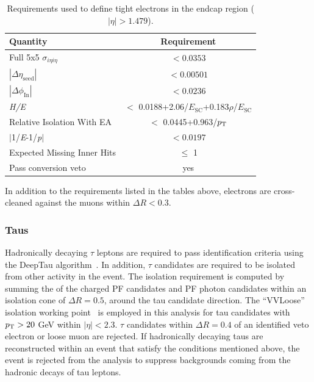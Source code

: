 \begin{table}[htbp]
\centering
\def\arraystretch{1.2}
\begin{tabular}{|l|c|}
    \hline\hline
    Quantity & Requirement \\\hline
    Full 5x5 $\sigma_{i\eta i\eta}$ &  $< 0.0353$ \\
    $|\Delta\eta_{\mathrm{seed}}|$ & $< 0.00501$  \\
    $|\Delta\phi_{\mathrm{In}}|$ & $< 0.0236$ \\
    \textit{H/E} & $<$ 0.0188+2.06/$E_{\mathrm{SC}}$+0.183$\rho$/$E_{\mathrm{SC}}$ \\
    Relative Isolation With EA & $<$ 0.0445+0.963/$p_{\textrm{T}}$ \\
    $|$1/\textit{E}-1/\textit{p}$|$ & $< 0.0197$ \\
    Expected Missing Inner Hits & $\leq$ 1 \\
    Pass conversion veto & yes \\
    \hline\hline
\end{tabular}
\caption{Requirements used to define tight electrons in the endcap region ($|\eta| > 1.479$).}
\label{tab:tight_electron_def_endcap}
\end{table}

In addition to the requirements listed in the tables above, electrons are cross-cleaned against the muons
within $\Delta R < 0.3$.

\subsubsection{Taus}

Hadronically decaying $\tau$ leptons are required to pass identification criteria
using the DeepTau algorithm~\cite{CMS-DP-2019-033}. In addition, $\tau$ candidates are required to be isolated from other activity in the
event. The isolation requirement is computed by summing the \pt of the charged PF
candidates and PF photon candidates within an isolation cone of $\Delta R = 0.5$,
around the tau candidate direction. 
The ``VVLoose'' isolation working point~\cite{taupog_twiki} is employed in this analysis
for tau candidates with $p_{\textrm{T}} > 20$ GeV within $|\eta| < 2.3$. $\tau$ candidates within $\Delta R = 0.4$ of 
an identified veto electron or loose muon are rejected. If hadronically decaying taus are reconstructed within
an event that satisfy the conditions mentioned above, the event is rejected from the analysis to suppress 
backgrounds coming from the hadronic decays of tau leptons. 

